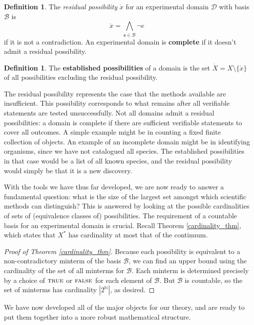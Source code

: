 \documentclass[psamsfonts]{amsart}
\theoremstyle{definition}
\newtheorem{defn}[thm]{Definition}
\theoremstyle{remark}
\numberwithin{equation}{section}
\newcommand{\N}{\mathbb{N}}
\def\TRUE{\textsc{true}}
\def\FALSE{\textsc{false}}
\def\bigAND{\bigwedge}
\def\NOT{\neg}
\newcommand{\stmt}[1][s] {\mathsf{#1}}
\newcommand{\edomain}[1][D] {\mathcal{#1}}
\newcommand{\basis}[1][B] {\mathcal{#1}} %
\begin{document}
	\begin{defn}
		The \emph{residual possibility} $\mathring{x}$ for an experimental domain $\edomain$ with basis $\basis$ is $$\mathring{x} = \bigAND\limits_{\stmt[e] \in \basis} \NOT e$$ if it is not a contradiction. An experimental domain is \textbf{complete} if it doesn't admit a residual possibility.
	\end{defn}

	\begin{defn}
	The \textbf{established possibilities} of a domain is the set $\dot{X}=X\setminus\{\mathring{x}\}$ of all possibilities excluding the residual possibility.
\end{defn}

The residual possibility represents the case that the methods available are insufficient. This possibility corresponds to what remains after all verifiable statements are tested unsuccessfully. Not all domains admit a residual possibilities: a domain is complete if there are sufficient verifiable statements to cover all outcomes. A simple example might be in counting a fixed finite collection of objects. An example of an incomplete domain might be in identifying organisms, since we have not catalogued all species. The established possibilities in that case would be a list of all known species, and the residual possibility would simply be that it is a new discovery. 

With the tools we have thus far developed, we are now ready to answer a fundamental question: what is the size of the largest set amongst which scientific methods can distinguish? This is answered by looking at the possible cardinalities of sets of (equivalence classes of) possibilities. The requirement of a countable basis for an experimental domain is crucial. Recall Theorem \ref{cardinality_thm}, which states that $X^*$ has cardinality at most that of the continuum. 


\begin{proof}[Proof of Theorem \ref{cardinality_thm}]
Because each possibility is equivalent to a non-contradictory minterm of the basis $\basis$, we can find an upper bound using the cardinality of the set of all minterms for $\basis$. Each minterm is determined precisely by a choice of $\TRUE$ or $\FALSE$ for each element of $\basis$. But $\basis$ is countable, so the set of minterms has cardinality $|2^{\N}|$, as desired.
\end{proof}

We have now developed all of the major objects for our theory, and are ready to put them together into a more robust mathematical structure. 
\end{document}
